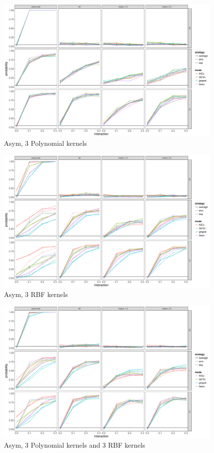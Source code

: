 \documentclass[11pt]{article}
\begin{document}
\begin{figure}
\begin{center}
\includegraphics[width=0.9\columnwidth]{A2} 
\caption{Asym, 3 Polynomial kernels}
\label{fig:res}
\end{center}
\end{figure}

\begin{figure}
\begin{center}
\includegraphics[width=0.9\columnwidth]{A3} 
\caption{Asym, 3 RBF kernels}
\label{fig:res}
\end{center}
\end{figure}

\begin{figure}
\begin{center}
\includegraphics[width=0.9\columnwidth]{A4} 
\caption{Asym, 3 Polynomial kernels and 3 RBF kernels}
\label{fig:res}
\end{center}
\end{figure}
\end{document}
